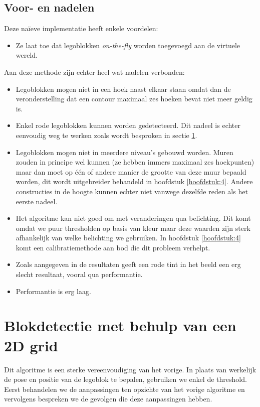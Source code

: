 \subsection{Voor- en nadelen}
Deze na\"ieve implementatie heeft enkele voordelen:
\begin{itemize}
\item Ze laat toe dat legoblokken \textit{on-the-fly} worden toegevoegd aan de virtuele wereld.
\end{itemize}
Aan deze methode zijn echter heel wat nadelen verbonden:
\begin{itemize}
\item Legoblokken mogen niet in een hoek naast elkaar staan omdat dan de veronderstelling dat een contour maximaal zes hoeken bevat niet meer geldig is.
\item Enkel rode legoblokken kunnen worden gedetecteerd. Dit nadeel is echter eenvoudig weg te werken zoals wordt besproken in sectie \ref{sec:algo_grid}.
\item Legoblokken mogen niet in meerdere niveau's gebouwd worden. Muren zouden in principe wel kunnen (ze hebben immers maximaal zes hoekpunten) maar dan moet op \'e\'en of andere manier de grootte van deze muur bepaald worden, dit wordt uitgebreider behandeld in hoofdstuk \ref{hoofdstuk:4}. Andere constructies in de hoogte kunnen echter niet vanwege dezelfde reden als het eerste nadeel.
\item Het algoritme kan niet goed om met veranderingen qua belichting. Dit komt omdat we puur thresholden op basis van kleur maar deze waarden zijn sterk afhankelijk van welke belichting we gebruiken. In hoofdstuk \ref{hoofdstuk:4} komt een calibratiemethode aan bod die dit probleem verhelpt.
\item Zoals aangegeven in de resultaten geeft een rode tint in het beeld een erg slecht resultaat, vooral qua performantie.
\item Performantie is erg laag.
\end{itemize}
 
\section{Blokdetectie met behulp van een 2D grid} \label{sec:algo_grid}
Dit algoritme is een sterke vereenvoudiging van het vorige. In plaats van werkelijk de pose en positie van de legoblok te bepalen, gebruiken we enkel de threshold. Eerst behandelen we de aanpassingen ten opzichte van het vorige algoritme en vervolgens bespreken we de gevolgen die deze aanpassingen hebben.

